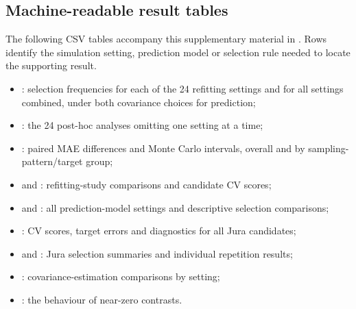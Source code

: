 \documentclass[11pt,a4paper]{article}
\begin{document}
\subsection{Machine-readable result tables}
\label{sec:result-tables}
The following CSV tables accompany this supplementary material in . Rows identify the simulation setting, prediction model or selection rule needed to locate the supporting result.
\begin{itemize}
\item {}: selection frequencies for each of the 24 refitting settings and for all settings combined, under both covariance choices for prediction;
\item {}: the 24 post-hoc analyses omitting one setting at a time;
\item {}: paired MAE differences and Monte Carlo intervals, overall and by sampling-pattern/target group;
\item {} and : refitting-study comparisons and candidate CV scores;
\item {} and : all prediction-model settings and descriptive selection comparisons;
\item {}: CV scores, target errors and diagnostics for all Jura candidates;
\item {} and : Jura selection summaries and individual repetition results;
\item {}: covariance-estimation comparisons by setting;
\item {}: the behaviour of near-zero contrasts.
\end{itemize}



\end{document}
